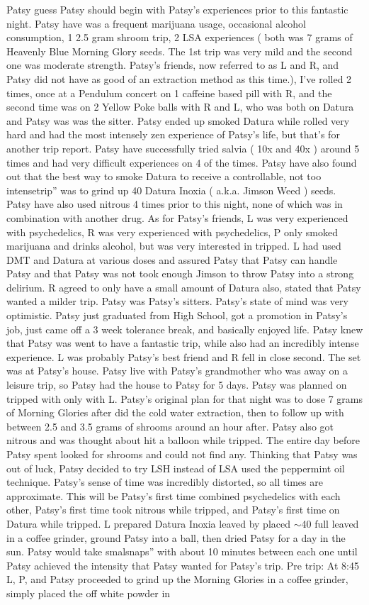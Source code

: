 \documentclass[12pt]{book}
\begin{document}
Patsy guess Patsy should begin with Patsy's experiences prior to this fantastic night. Patsy have was a frequent marijuana usage, occasional alcohol consumption, 1 2.5 gram shroom trip, 2 LSA experiences ( both was 7 grams of Heavenly Blue Morning Glory seeds. The 1st trip was very mild and the second one was moderate strength. Patsy's friends, now referred to as L and R, and Patsy did not have as good of an extraction method as this time.), I've rolled 2 times, once at a Pendulum concert on 1 caffeine based pill with R, and the second time was on 2 Yellow Poke balls with R and L, who was both on Datura and Patsy was was the sitter. Patsy ended up smoked Datura while rolled very hard and had the most intensely zen experience of Patsy's life, but that's for another trip report. Patsy have successfully tried salvia ( 10x and 40x ) around 5 times and had very difficult experiences on 4 of the times. Patsy have also found out that the best way to smoke Datura to receive a controllable, not too intensetrip'' was to grind up 40 Datura Inoxia ( a.k.a. Jimson Weed ) seeds. Patsy have also used nitrous 4 times prior to this night, none of which was in combination with another drug. As for Patsy's friends, L was very experienced with psychedelics, R was very experienced with psychedelics, P only smoked marijuana and drinks alcohol, but was very interested in tripped. L had used DMT and Datura at various doses and assured Patsy that Patsy can handle Patsy and that Patsy was not took enough Jimson to throw Patsy into a strong delirium. R agreed to only have a small amount of Datura also, stated that Patsy wanted a milder trip. Patsy was Patsy's sitters. Patsy's state of mind was very optimistic. Patsy just graduated from High School, got a promotion in Patsy's job, just came off a 3 week tolerance break, and basically enjoyed life. Patsy knew that Patsy was went to have a fantastic trip, while also had an incredibly intense experience. L was probably Patsy's best friend and R fell in close second. The set was at Patsy's house. Patsy live with Patsy's grandmother who was away on a leisure trip, so Patsy had the house to Patsy for 5 days. Patsy was planned on tripped with only with L. Patsy's original plan for that night was to dose 7 grams of Morning Glories after did the cold water extraction, then to follow up with between 2.5 and 3.5 grams of shrooms around an hour after. Patsy also got nitrous and was thought about hit a balloon while tripped. The entire day before Patsy spent looked for shrooms and could not find any. Thinking that Patsy was out of luck, Patsy decided to try LSH instead of LSA used the peppermint oil technique. Patsy's sense of time was incredibly distorted, so all times are approximate. This will be Patsy's first time combined psychedelics with each other, Patsy's first time took nitrous while tripped, and Patsy's first time on Datura while tripped. L prepared Datura Inoxia leaved by placed $\sim$40 full leaved in a coffee grinder, ground Patsy into a ball, then dried Patsy for a day in the sun. Patsy would take smalsnaps'' with about 10 minutes between each one until Patsy achieved the intensity that Patsy wanted for Patsy's trip. Pre trip: At 8:45 L, P, and Patsy proceeded to grind up the Morning Glories in a coffee grinder, simply placed the off white powder in 
\end{document}
